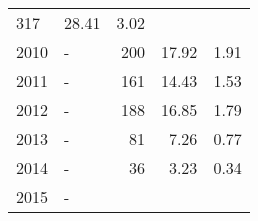 \begin{longtable}{lXrrr}
       \num{317} &
       \num[round-mode=places,round-precision=2]{28.41} &
         \num[round-mode=places,round-precision=2]{3.02} \\

     2010 &
     \multicolumn{1}{X}{ -  } &


       \num{200} &
       \num[round-mode=places,round-precision=2]{17.92} &
         \num[round-mode=places,round-precision=2]{1.91} \\

     2011 &
     \multicolumn{1}{X}{ -  } &


       \num{161} &
       \num[round-mode=places,round-precision=2]{14.43} &
         \num[round-mode=places,round-precision=2]{1.53} \\

     2012 &
     \multicolumn{1}{X}{ -  } &


       \num{188} &
       \num[round-mode=places,round-precision=2]{16.85} &
         \num[round-mode=places,round-precision=2]{1.79} \\

     2013 &
     \multicolumn{1}{X}{ -  } &


       \num{81} &
       \num[round-mode=places,round-precision=2]{7.26} &
         \num[round-mode=places,round-precision=2]{0.77} \\

     2014 &
     \multicolumn{1}{X}{ -  } &


       \num{36} &
       \num[round-mode=places,round-precision=2]{3.23} &
         \num[round-mode=places,round-precision=2]{0.34} \\

     2015 &
     \multicolumn{1}{X}{ -  } &



\end{longtable}
